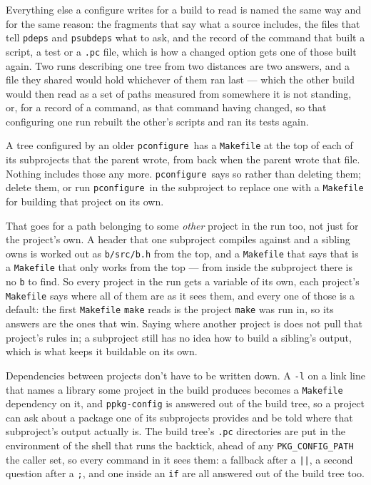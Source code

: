 \documentclass{article}
\newcommand{\pconfigure}{\texttt{pconfigure}}
\begin{document}
Everything else a configure writes for a build to read is named the
same way and for the same reason: the fragments that say what a source
includes, the files that tell \texttt{pdeps} and
\texttt{psubdeps} what to ask, and the record of the command that
built a script, a test or a \texttt{.pc} file, which is how a changed
option gets one of those built again.  Two runs describing one tree
from two distances are two answers, and a file they shared would hold
whichever of them ran last --- which the other build would then read
as a set of paths measured from somewhere it is not standing, or, for
a record of a command, as that command having changed, so that
configuring one run rebuilt the other's scripts and ran its tests
again.

A tree configured by an older \pconfigure\ has a \texttt{Makefile} at
the top of each of its subprojects that the parent wrote, from back
when the parent wrote that file.  Nothing includes those any more.
\pconfigure\ says so rather than deleting them; delete them, or run
\pconfigure\ in the subproject to replace one with a \texttt{Makefile}
for building that project on its own.

That goes for a path belonging to some \textit{other} project in the
run too, not just for the project's own.  A header that one
subproject compiles against and a sibling owns is worked out as
\texttt{b/src/b.h} from the top, and a \texttt{Makefile} that says
that is a \texttt{Makefile} that only works from the top --- from
inside the subproject there is no \texttt{b} to find.  So every
project in the run gets a variable of its own, each project's
\texttt{Makefile} says where all of them are as it sees them, and
every one of those is a default: the first \texttt{Makefile}
\texttt{make} reads is the project \texttt{make} was run in, so its
answers are the ones that win.  Saying where another project is does
not pull that project's rules in; a subproject still has no idea how
to build a sibling's output, which is what keeps it buildable on its
own.

Dependencies between projects don't have to be written down.  A
\texttt{-l} on a link line that names a library some project in the
build produces becomes a \texttt{Makefile} dependency on it, and
\texttt{ppkg-config} is answered out of the build tree, so a project
can ask about a package one of its subprojects provides and be told
where that subproject's output actually is.  The build tree's
\texttt{.pc} directories are put in the environment of the shell that
runs the backtick, ahead of any \texttt{PKG\_CONFIG\_PATH} the caller
set, so every command in it sees them: a fallback after a
\texttt{||}, a second question after a \texttt{;}, and one inside an
\texttt{if} are all answered out of the build tree too.
\end{document}
